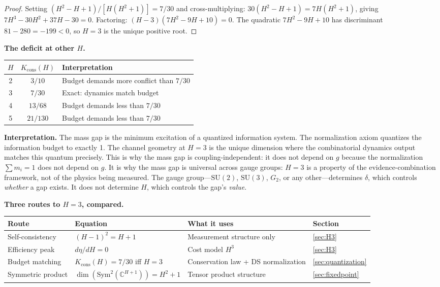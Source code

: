 \documentclass[11pt,a4paper]{article}
\theoremstyle{definition}
\theoremstyle{remark}
\newcommand{\C}{\mathbb{C}}
\newcommand{\SU}{\mathrm{SU}}
\begin{document}
\begin{proof}
Setting $(H^2-H+1)/[H(H^2+1)]=7/30$ and cross-multiplying: $30(H^2-H+1)=7H(H^2+1)$, giving $7H^3-30H^2+37H-30=0$. Factoring: $(H-3)(7H^2-9H+10)=0$. The quadratic $7H^2-9H+10$ has discriminant $81-280=-199<0$, so $H=3$ is the unique positive root.
\end{proof}

\textbf{The deficit at other $H$.}

\begin{center}
\begin{tabular}{ccl}
\toprule
$H$ & $K_{\mathrm{cons}}(H)$ & Interpretation \\
\midrule
2 & $3/10$ & Budget demands more conflict than $7/30$ \\
3 & $7/30$ & Exact: dynamics match budget \\
4 & $13/68$ & Budget demands less than $7/30$ \\
5 & $21/130$ & Budget demands less than $7/30$ \\
\bottomrule
\end{tabular}
\end{center}

\textbf{Interpretation.} The mass gap is the minimum excitation of a quantized information system. The normalization axiom quantizes the information budget to exactly 1. The channel geometry at $H=3$ is the unique dimension where the combinatorial dynamics output matches this quantum precisely. This is why the mass gap is coupling-independent: it does not depend on $g$ because the normalization $\sum m_i=1$ does not depend on $g$. It is why the mass gap is universal across gauge groups: $H=3$ is a property of the evidence-combination framework, not of the physics being measured. The gauge group---$\SU(2)$, $\SU(3)$, $G_2$, or any other---determines $\delta$, which controls \emph{whether} a gap exists. It does not determine $H$, which controls the gap's \emph{value}.

\textbf{Three routes to $H=3$, compared.}

\begin{center}
\begin{tabular}{llll}
\toprule
Route & Equation & What it uses & Section \\
\midrule
Self-consistency & $(H-1)^2=H+1$ & Measurement structure only & \ref{sec:H3} \\
Efficiency peak & $d\eta/dH=0$ & Cost model $H^3$ & \ref{sec:H3} \\
Budget matching & $K_{\mathrm{cons}}(H)=7/30$ iff $H=3$ & Conservation law + DS normalization & \ref{sec:quantization} \\
Symmetric product & $\dim(\mathrm{Sym}^2(\C^{H+1}))=H^2+1$ & Tensor product structure & \ref{sec:fixedpoint} \\
\bottomrule
\end{tabular}
\end{center}
\end{document}
